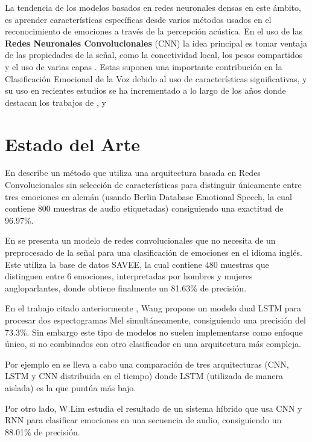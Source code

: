 \documentclass[11pt,a4paper,spanish]{book}
\begin{document}
	La tendencia de los modelos basados en redes neuronales densas en este ámbito, es aprender características específicas desde varios métodos usados en el reconocimiento de emociones a través de la percepción acústica. En el uso de las \textbf{Redes Neuronales Convolucionales} (CNN) la idea principal es tomar ventaja de las propiedades de la señal, como la conectividad local, los pesos compartidos y el uso de varias capas  \cite{Lim2017}. Estas suponen una importante contribución en la Clasificación Emocional de la Voz debido al uso de características significativas, y su uso en recientes estudios se ha incrementado a lo largo de los años donde destacan los trabajos de \cite{AbdulQayyum2019}, \cite{Anvarjon2020} y %
	
	
	\section{Estado del Arte}
	
	En \cite{Harar2017} describe un método que utiliza una arquitectura basada en Redes Convolucionales sin selección de características para distinguir únicamente entre tres emociones en alemán (usando Berlin Database Emotional Speech, la cual contiene 800 muestras de audio etiquetadas) consiguiendo una exactitud de 96.97\%.
	
	En \cite{AbdulQayyum2019} se presenta un modelo de redes convolucionales que no necesita de un preprocesado de la señal para una clasificación de emociones en el idioma inglés. Este utiliza la base de datos SAVEE, la cual contiene 480 muestras que distinguen entre 6 emociones, interpretadas por hombres y mujeres angloparlantes, donde obtiene finalmente un 81.63\% de precisión.
	
	En el trabajo citado anteriormente \cite{Wang2020}, Wang propone un modelo dual LSTM para procesar dos espectogramas Mel simultáneamente, consiguiendo una precisión del 73.3\%. 
	Sin embargo este tipo de modelos no suelen implementarse como enfoque único, si no combinados con otro clasificador en una arquitectura más compleja.
	
	Por ejemplo en \cite{Lim2017} se lleva a cabo una comparación de tres  arquitecturas (CNN, LSTM y CNN distribuida en el tiempo) donde LSTM (utilizada de manera aislada) es la que puntúa más bajo.
	
	Por otro lado, W.Lim \cite{Lim2017} estudia el resultado de un sistema híbrido que usa CNN y RNN para clasificar emociones en una secuencia de audio, consiguiendo un 88.01\% de precisión.
\end{document}
